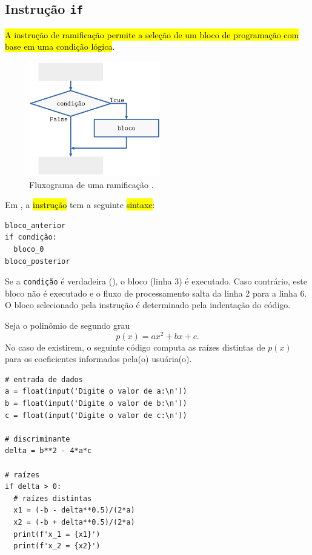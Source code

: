 \subsection{Instrução \texttt{if}}

\hl{A instrução de ramificação {\PYTHONif} permite a seleção de um bloco de programação com base em uma condição lógica}.

\begin{figure}[H]
  \centering
  \includegraphics[width=2.25in]{./cap_progest/dados/fig_fg_if/fig.png}
  \caption{Fluxograma de uma ramificação {\PYTHONif}.}
  \label{cap_progest_sec_ramifica:fig:fg_if}
\end{figure}

Em {\python}, a \hl{instrução {\PYTHONif}} tem a seguinte \hl{sintaxe}:

\begin{lstlisting}
bloco_anterior
if condição:
  bloco_0
bloco_posterior
\end{lstlisting}

Se a {\lstinline+condição+} é verdadeira ({\PYTHONTrue}), o bloco (linha 3) é executado. Caso contrário, este bloco não é executado e o fluxo de processamento salta da linha 2 para a linha 6. O bloco selecionado pela instrução {\PYTHONif} é determinado pela indentação do código.

\begin{ex}\label{cap_progest_sec_ramifica:ex:bhaskara_if}
  Seja o polinômio de segundo grau
  \begin{equation}
    p(x) = ax^2 + bx + c.
  \end{equation}
  No caso de existirem, o seguinte código computa as raízes distintas de $p(x)$ para os coeficientes informados pela(o) usuária(o).

\begin{lstlisting}
# entrada de dados
a = float(input('Digite o valor de a:\n'))
b = float(input('Digite o valor de b:\n'))
c = float(input('Digite o valor de c:\n'))

# discriminante
delta = b**2 - 4*a*c

# raízes
if delta > 0:
  # raízes distintas
  x1 = (-b - delta**0.5)/(2*a)
  x2 = (-b + delta**0.5)/(2*a)
  print(f'x_1 = {x1}')
  print(f'x_2 = {x2}')
\end{lstlisting}

\end{ex}

